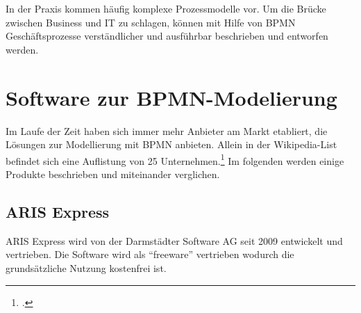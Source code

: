 In der Praxis kommen häufig komplexe Prozessmodelle vor. 
Um die Brücke zwischen Business und IT zu schlagen, 
können mit Hilfe von BPMN Geschäftsprozesse verständlicher und ausführbar 
beschrieben und entworfen werden.\\




\clearpage
\section{Software zur BPMN-Modelierung}

Im Laufe der Zeit haben sich immer mehr Anbieter am Markt etabliert, die
Lösungen zur Modellierung mit BPMN anbieten. Allein in der Wikipedia-List
befindet sich eine Auflistung von 25 Unternehmen.\footcite{wikitools}
Im folgenden werden einige Produkte beschrieben und miteinander
verglichen.

\subsection{ARIS Express}

ARIS Express wird von der Darmstädter Software AG seit 2009 entwickelt und
vertrieben. Die Software wird als "`freeware"' vertrieben wodurch die
grundsätzliche Nutzung kostenfrei ist.

\begin{figure}[H]
\begin{minipage}{\linewidth}
\begin{center}
\end{center}
\end{minipage}
\end{figure}


